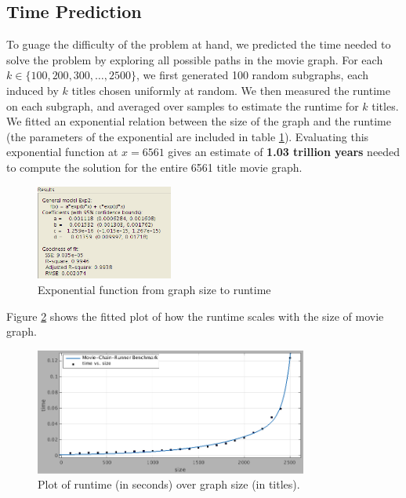 \documentclass[11pt,english]{article}
\begin{document}
\newpage
\begin{appendices}

\section{Time Prediction}
To guage the difficulty of the problem at hand, we predicted the time needed to
solve the problem by exploring all possible paths in the movie graph. For each
$k \in \{100,200,300,\dots,2500\}$, we first generated 100 random subgraphs,
each induced by $k$ titles chosen uniformly at random. We then measured the
runtime on each subgraph, and averaged over samples to estimate the runtime for
$k$ titles. We fitted an exponential relation between the size of the graph and
the runtime (the parameters of the exponential are included in table
\ref{fig:exp_par}). Evaluating this exponential function at $x = 6561$ gives an
estimate of {\bf 1.03 trillion years} needed to compute the solution for the
entire 6561 title movie graph.

\begin{figure}[h]
\begin{center}
\includegraphics[width=0.4\textwidth]{Benchmark2}
\end{center}
\vspace{-5mm}
\caption{Exponential function from graph size to runtime}
\label{fig:exp_par}
\vspace{-2mm}
\end{figure}

Figure \ref{fig:bm1} shows the fitted plot of how the runtime scales with the
size of movie graph.
\begin{figure}[h]
\begin{center}
\includegraphics[width=0.8\textwidth]{Benchmark1}
\end{center}
\vspace{-7mm}
\caption{Plot of runtime (in seconds) over graph size (in titles).}
\label{fig:bm1}
\vspace{-2mm}
\end{figure}


\end{appendices}
\end{document}

